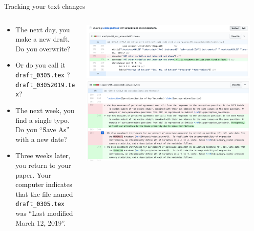\documentclass[ignorenonframetext,notes, 10pt, aspectratio=169]{beamer}
\begin{document}
\begin{frame}{Tracking your text changes}
\begin{columns}[T]
\begin{column}{0.4\textwidth}

\begin{itemize}
\item The next day, you make a new draft. Do you overwrite?\pause
\item Or do you call it \texttt{draft\_0305.tex} ? \texttt{draft\_03052019.tex}?\pause
\item The next week, you find a single typo. Do you ``Save As'' with a new date?\pause
\item Three weeks later, you return to your paper.   Your computer indicates that the file named \texttt{draft\_0305.tex} was ``Last modified March 12, 2019''.
\end{itemize}
\end{column}
\begin{column}{0.6\textwidth}\pause
\includegraphics[width = \linewidth]{writing-diff-1.png}
\includegraphics[width = \linewidth]{writing-diff-2.png}
\end{column}
\end{columns}
\end{frame}
\end{document}
